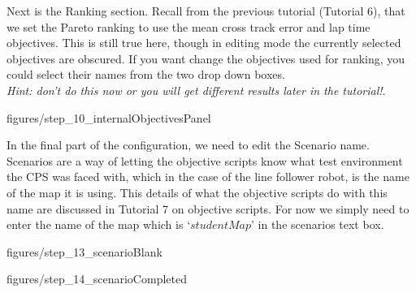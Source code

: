\documentclass[11pt,a4paper]{../tutorial}
\begin{document}
{Next is the Ranking section.  Recall from the previous tutorial (Tutorial 6), that we set the Pareto ranking to use the mean cross track error and lap time objectives. This is still true here, though in editing mode the currently selected objectives are obscured.  If you want change the objectives used for ranking, you could select their names from the two drop down boxes. \\ \emph{Hint: don’t do this now or you will get different results later in the tutorial!}.

\begin{center}\begin{annotation}[width=0.7\linewidth,trim=0 0 0 0,clip]{figures/step_10_internalObjectivesPanel}
    \end{annotation}\end{center}

 \newpage
In the final part of the configuration, we need to edit the Scenario name. Scenarios are a way of letting the objective scripts know what test environment the CPS was faced with, which in the case of the line follower robot, is the name of the map it is using. This details of what the objective scripts do with this name are discussed in Tutorial 7 on objective scripts.  For now we simply need to enter the name of the map which is ‘$studentMap$’ in the scenarios text box.



\begin{center}\begin{annotation}[width=0.7\linewidth,trim=0 0 0 0,clip]{figures/step_13_scenarioBlank}
    \end{annotation}\end{center}






\begin{center}\begin{annotation}[width=0.7\linewidth,trim=0 0 0 0,clip]{figures/step_14_scenarioCompleted}
    \end{annotation}\end{center}


}
\end{document}
